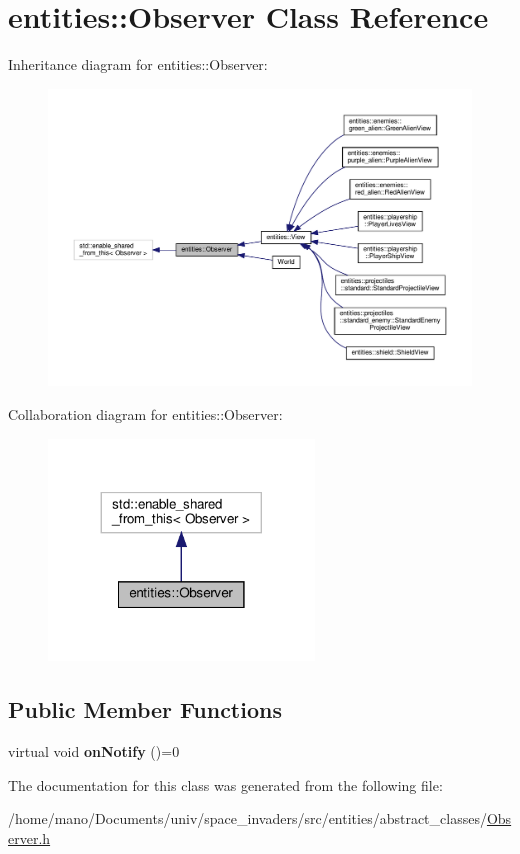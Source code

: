 \hypertarget{classentities_1_1Observer}{}\section{entities\+:\+:Observer Class Reference}
\label{classentities_1_1Observer}


Inheritance diagram for entities\+:\+:Observer\+:\nopagebreak
\begin{figure}[H]
\begin{center}
\leavevmode
\includegraphics[width=350pt]{classentities_1_1Observer__inherit__graph}
\end{center}
\end{figure}


Collaboration diagram for entities\+:\+:Observer\+:\nopagebreak
\begin{figure}[H]
\begin{center}
\leavevmode
\includegraphics[width=200pt]{classentities_1_1Observer__coll__graph}
\end{center}
\end{figure}
\subsection*{Public Member Functions}
\begin{DoxyCompactItemize}
\item 
\mbox{\label{classentities_1_1Observer_a6c3561b7219abd0f4de7e21e52a899b8}} 
virtual void {\bfseries on\+Notify} ()=0
\end{DoxyCompactItemize}


The documentation for this class was generated from the following file\+:\begin{DoxyCompactItemize}
\item 
/home/mano/\+Documents/univ/space\+\_\+invaders/src/entities/abstract\+\_\+classes/\hyperlink{Observer_8h}{Observer.\+h}\end{DoxyCompactItemize}
